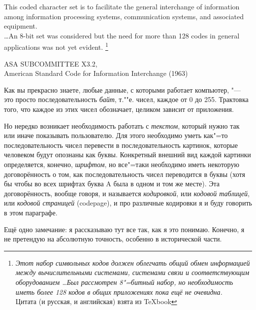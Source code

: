 

\epigraph{This coded character set is to facilitate
the general interchange of information
among information processing systems,
communication systems, and
associated equipment.\\
\dots An 8-bit set was considered
but the need for more than 128 codes
in general applications was not yet evident.
\footnote{\textit{Этот набор символьных кодов должен облегчать общий обмен информацией 
между вычислительными системами, системами связи и соответствующим 
оборудованием
\dots Был рассмотрен 8"=битный набор, но необходимость иметь более 128 кодов в 
общих приложениях пока ещё не очевидна.}\\
Цитата (и русская, и английская) взята из \TeX book}
}
{ASA SUBCOMMITTEE X3.2,\\
American Standard Code for Information Interchange (1963)\\
}

Как вы прекрасно знаете, любые данные, с которыми работает компьютер, "--- это 
просто последовательность \textit{байт}, т.""е. чисел, каждое от 0 до 255. 
Трактовка того, что каждое из этих чисел обозначает, целиком зависит от 
приложения.

Но нередко возникает необходимость работать с \textit{текстом}, который нужно так или 
иначе показывать пользователю. Для этого необходимо уметь как"=то 
последовательность чисел перевести в последовательность картинок, которые 
человеком будут опознаны как буквы. Конкретный внешний вид каждой картинки 
определяется, конечно, \textit{шрифтом}, но все"=таки необходимо иметь 
некоторую договорённость о том, как последовательность чисел переводится в 
буквы (хотя бы чтобы во всех шрифтах буква A была в одном и том же месте).      
Эта договорённость, вообще говоря, и называется \textit{кодировкой}, или \textit{кодовой таблицей},
или \textit{кодовой страницей} (codepage), и про 
различные кодировки я и буду говорить в этом параграфе.


Ещё одно замечание: я рассказываю тут все так, как я это понимаю. Конечно, 
я не претендую на абсолютную точность, особенно в исторической части.

